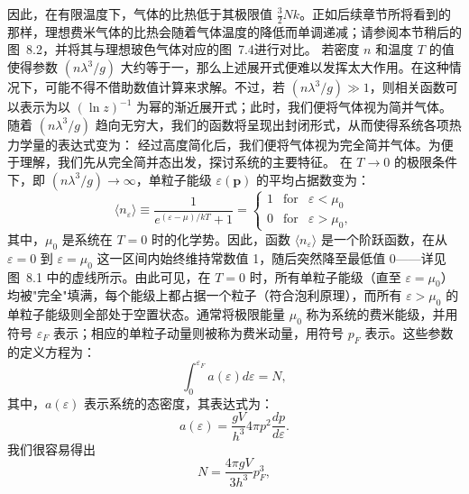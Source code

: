 因此，在有限温度下，气体的比热低于其极限值 \(\frac{3}{2}Nk\)。正如后续章节所将看到的那样，理想费米气体的比热会随着气体温度的降低而单调递减；请参阅本节稍后的图~8.2，并将其与理想玻色气体对应的图~7.4进行对比。
若密度 \(n\) 和温度 \(T\) 的值使得参数 \((n\lambda^{3}/g)\) 大约等于一，那么上述展开式便难以发挥太大作用。在这种情况下，可能不得不借助数值计算来求解。不过，若 \((n\lambda^{3}/g) \gg 1\)，则相关函数可以表示为以 \((\ln z)^{-1}\) 为幂的渐近展开式；此时，我们便将气体视为简并气体。随着 \((n\lambda^{3}/g)\) 趋向无穷大，我们的函数将呈现出封闭形式，从而使得系统各项热力学量的表达式变为：
经过高度简化后，我们便将气体视为完全简并气体。为便于理解，我们先从完全简并态出发，探讨系统的主要特征。
在 \(T \to 0\) 的极限条件下，即 \((n\lambda^3/g) \to \infty\)，单粒子能级 \(\varepsilon(\mathbf{p})\) 的平均占据数变为：
\begin{equation}\tag{8.1.19}\label{eq:8.1.19}
\langle n _ { \varepsilon } \rangle \equiv \frac { 1 } { e ^{( \varepsilon - \mu ) / k T} + 1 } = \left\{ \begin{array}{lll} { 1 } & { \mathrm { f o r } } & { \varepsilon < \mu _ { 0 } } \\{ 0 } & { \mathrm { f o r } } & { \varepsilon > \mu _ { 0 } , } \end{array} \right.
\end{equation}
其中，\(\mu_{0}\) 是系统在 \(T=0\) 时的化学势。因此，函数 \(\langle n_{\varepsilon}\rangle\) 是一个阶跃函数，在从 \(\varepsilon=0\) 到 \(\varepsilon=\mu_{0}\) 这一区间内始终维持常数值 1，随后突然降至最低值 0——详见图~8.1 中的虚线所示。由此可见，在 \(T=0\) 时，所有单粒子能级（直至 \(\varepsilon=\mu_{0}\)）均被"完全"填满，每个能级上都占据一个粒子（符合泡利原理），而所有 \(\varepsilon>\mu_{0}\) 的单粒子能级则全部处于空置状态。通常将极限能量 \(\mu_{0}\) 称为系统的费米能级，并用符号 \(\varepsilon_{F}\) 表示；相应的单粒子动量则被称为费米动量，用符号 \(p_{F}\) 表示。这些参数的定义方程为：
\begin{equation}\tag{8.1.20}\label{eq:8.1.20}
\int _ { 0 } ^{\varepsilon _ { F} } a ( \varepsilon ) d \varepsilon = N ,
\end{equation}
其中，\(a(\varepsilon)\) 表示系统的态密度，其表达式为：
\begin{equation}\tag{8.1.21}\label{eq:8.1.21}
a ( \varepsilon ) = \frac { g V } { h ^{3} } 4 \pi p ^{2} \frac { d p } { d \varepsilon } .
\end{equation}
我们很容易得出
\begin{equation}\tag{8.1.22}\label{eq:8.1.22}
N = \frac { 4 \pi g V } { 3 h ^{3} } p _ { F } ^{3} ,
\end{equation}
